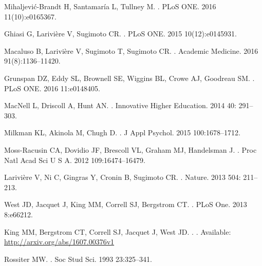 \documentclass[10pt,letterpaper]{article}
\begin{document}
\begin{flushleft}
\begin{thebibliography}{10}
  Mihaljevi{\'c}-Brandt H, Santamar{\'i}a L, Tullney M.
.
\newblock PLoS ONE. 2016 11(10):e0165367.

Ghiasi G, Larivi{\`e}re V, Sugimoto CR.
.
\newblock PLoS ONE. 2015 10(12):e0145931.
 
Macaluso B, Larivi{\`e}re V, Sugimoto T, Sugimoto CR.
.
\newblock Academic Medicine. 2016  91(8):1136–11420.

Grunspan DZ, Eddy SL, Brownell SE, Wiggins BL, Crowe AJ, Goodreau SM. 
.
\newblock PLoS ONE. 2016 11:e0148405.
  
MacNell L, Driscoll A, Hunt AN.
.
\newblock   Innovative Higher Education. 2014 40: 291–303.
  
Milkman KL, Akinola M, Chugh D.
.
\newblock J Appl Psychol. 2015 100:1678–1712.

Moss-Racusin CA, Dovidio JF, Brescoll VL, Graham MJ, Handelsman J.
.
\newblock  Proc Natl Acad Sci U S A. 2012 109:16474–16479.

Larivi{\`e}re V, Ni C, Gingras Y, Cronin B, Sugimoto CR. 
.
\newblock  Nature. 2013 504: 211–213.

West JD, Jacquet J, King MM, Correll SJ, Bergstrom CT.
.
\newblock PLoS One. 2013 8:e66212.

King MM, Bergstrom CT, Correll SJ, Jacquet J, West JD.
.
. Available: \url{http://arxiv.org/abs/1607.00376v1}

Rossiter MW.
.
\newblock  Soc Stud Sci. 1993 23:325–341.



\end{thebibliography}
\end{flushleft}
\end{document}

